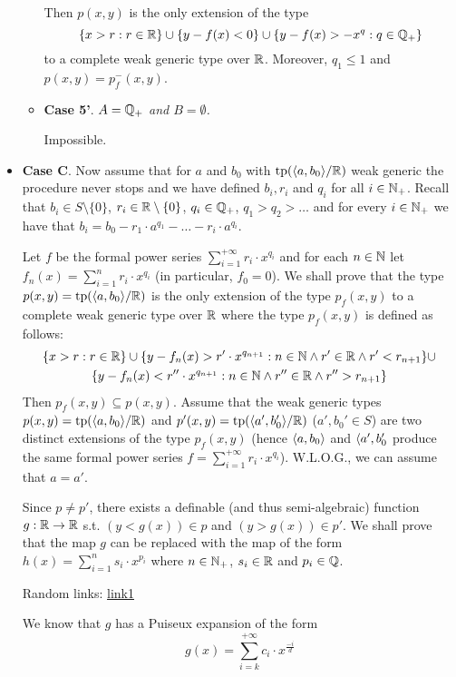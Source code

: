\documentclass[11pt]{article}
\begin{document}
\begin{itemize}
\begin{itemize}
Then \(p(x,y)\) is the only extension of the type
\begin{equation*}
\{x>r:r\in\mathbb{R}\}\cup\{y-f(x)<0\}\cup\{y-f(x)>-x^q:q\in\mathbb{Q}_+\}
\end{equation*}
to a complete weak generic type over \(\mathbb{R}\). Moreover, \(q_1\le 1\) and \(p(x,y)=p_f^-(x,y)\).
\item \textbf{Case 5'}. \emph{\(A=\mathbb{Q}_+\) and \(B=\emptyset\).}

Impossible.
\end{itemize}
\item \textbf{Case C}. Now assume that for \(a\) and \(b_0\) with \(\operatorname{tp}(\langle a,b_0\rangle/\mathbb{R})\) weak generic the
procedure never stops and we have defined \(b_i,r_i\) and \(q_i\) for all \(i\in\mathbb{N}_+\). Recall
that \(b_i\in S\setminus\{0\}\), \(r_i\in\mathbb{R}\setminus\{0\}\), \(q_i\in\mathbb{Q}_+\), \(q_1>q_2>\dots\) and for every \(i\in\mathbb{N}_+\) we have
that \(b_i=b_0-r_1\cdot a^{q_1}-\dots-r_i\cdot a^{q_i}\).

Let \(f\) be the formal power series \(\sum_{i=1}^{+\infty}r_i\cdot x^{q_i}\) and for each \(n\in\mathbb{N}\)
let \(f_n(x)=\sum_{i=1}^nr_i\cdot x^{q_i}\) (in particular, \(f_0=0\)). We shall prove that the
type \(p(x,y)=\operatorname{tp}(\langle a,b_0\rangle/\mathbb{R})\) is the only extension of the type \(p_f(x,y)\) to a complete
weak generic type over \(\mathbb{R}\) where the type \(p_f(x,y)\) is defined as follows:
\begin{gather*}
  \{x>r:r\in\mathbb{R}\}\cup\{y-f_n(x)>r'\cdot x^{q_{n+1}}:n\in\mathbb{N}\wedge r'\in\mathbb{R}\wedge r'<r_{n+1}\}\cup\\
  \{y-f_n(x)<r''\cdot x^{q_{n+1}}:n\in\mathbb{N}\wedge r''\in\mathbb{R}\wedge r''>r_{n+1}\}
\end{gather*}
Then \(p_f(x,y)\subseteq p(x,y)\). Assume that the weak generic types \(p(x,y)=\operatorname{tp}(\langle a,b_0\rangle/\mathbb{R})\)
and \(p'(x,y)=\operatorname{tp}(\langle a',b_0'\rangle/\mathbb{R})\) (\(a',b_0'\in S\)) are two distinct extensions of the
type \(p_f(x,y)\) (hence \(\langle a,b_0\rangle\) and \(\langle a',b_0'\) produce the same formal power
series \(f=\sum_{i=1}^{+\infty}r_i\cdot x^{q_i}\)). W.L.O.G., we can assume that \(a=a'\).

Since \(p\neq p'\), there exists a definable (and thus semi-algebraic) function \(g:\mathbb{R}\to\mathbb{R}\)
s.t. \((y<g(x))\in p\) and \((y>g(x))\in p'\). We shall prove that the map \(g\) can be replaced
with the map of the form \(h(x)=\sum_{i=1}^ns_i\cdot x^{p_i}\) where \(n\in\mathbb{N}_+\), \(s_i\in\mathbb{R}\) and \(p_i\in\mathbb{Q}\).

Random links: \href{http://homepages.math.uic.edu/\~jan/mcs563s14/puiseux.pdf}{link1}

We know that \(g\) has a Puiseux expansion of the form
\begin{equation*}
g(x)=\sum_{i=k}^{+\infty}c_i\cdot x^{\frac{-i}{d}}\tag{\star}
\end{equation*}


\end{itemize}
\end{document}
